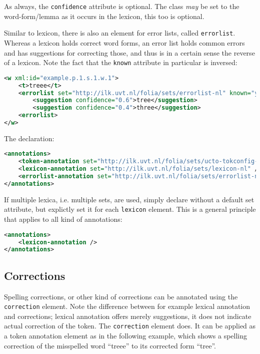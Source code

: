\documentclass[a4paper,12pt]{report}
\begin{document}
As always, the \texttt{confidence} attribute is optional. The class \emph{may} be set to the word-form/lemma as it occurs in the lexicon, this too is optional.

Similar to lexicon, there is also an element for error lists, called \texttt{errorlist}. Whereas a lexicon holds correct word forms, an error list holds common errors and has suggestions for correcting those, and thus is in a certain sense the reverse of a lexicon. Note the fact that the \texttt{known} attribute in particular is inversed:


\begin{lstlisting}[language=xml]
<w xml:id="example.p.1.s.1.w.1">
    <t>treee</t>
    <errorlist set="http://ilk.uvt.nl/folia/sets/errorlist-nl" known="yes">    
        <suggestion confidence="0.6">tree</suggestion>
        <suggestion confidence="0.4">three</suggestion>
    <errorlist>
</w>
\end{lstlisting}

The declaration:

\begin{lstlisting}[language=xml]
<annotations>
    <token-annotation set="http://ilk.uvt.nl/folia/sets/ucto-tokconfig-nl" annotator="ucto" annotatortype="auto" />
    <lexicon-annotation set="http://ilk.uvt.nl/folia/sets/lexicon-nl" />
    <errorlist-annotation set="http://ilk.uvt.nl/folia/sets/errorlist-nl" />
</annotations>
\end{lstlisting}

If multiple lexica, i.e. multiple sets, are used, simply declare without a default set attribute, but explictly set it for each \texttt{lexicon} element. This is a general principle that applies to all kind of annotations:

\begin{lstlisting}[language=xml]
<annotations>
    <lexicon-annotation />
</annotations>
\end{lstlisting}

\subsection{Corrections}

Spelling corrections, or other kind of corrections can be annotated using the \texttt{correction} element. Note the difference between for example lexical annotation and corrections; lexical annotation offers merely suggestions, it does not indicate actual correction of the token. The \texttt{correction} element does. It can be applied as a token annotation element as in the following example, which shows a spelling correction of the misspelled word ``treee'' to its corrected form ``tree''.
\end{document}
